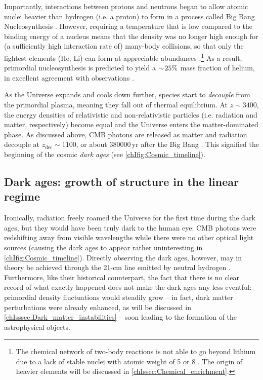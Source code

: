 Importantly, interactions between protons and neutrons began to allow atomic nuclei heavier than hydrogen (i.e. a proton) to form in a process called Big Bang Nucleosynthesis \citep[BBN; work on this was pioneered by][]{1949RvMP...21..367G}. However, requiring a temperature that is low compared to the binding energy of a nucleus means that the density was no longer high enough for (a sufficiently high interaction rate of) many-body collisions, so that only the lightest elements (He, Li) can form at appreciable abundances \citep{1967ApJ...148....3W}.\footnote{The chemical network of two-body reactions is not able to go beyond lithium due to a lack of stable nuclei with atomic weight of 5 or 8 \citep[e.g.][]{2010gfe..book.....M}. The origin of heavier elements will be discussed in \cref{chIssec:Chemical_enrichment}.} As a result, primordial nucleosynthesis is predicted to yield a $\sim \! 25\%$ mass fraction of helium, in excellent agreement with observations \citep[and hence considered a key validation of the Big Bang theory;][]{2016RvMP...88a5004C}.

As the Universe expands and cools down further, species start to \textit{decouple} from the primordial plasma, meaning they fall out of thermal equilibrium. At $z \sim 3400$, the energy densities of relativistic and non-relativistic particles (i.e. radiation and matter, respectively) become equal and the Universe enters the matter-dominated phase. As discussed above, CMB photons are released as matter and radiation decouple at $z_\text{dec} \sim 1100$, or about $\num{380000} \, \mathrm{yr}$ after the Big Bang \citep{2010gfe..book.....M}. This signified the beginning of the cosmic \textit{dark ages} (see \cref{chIfig:Cosmic_timeline}).

\subsection{Dark ages: growth of structure in the linear regime}
\label{chIssec:Growth_of_structure_in_the_linear_regime}

Ironically, radiation freely roamed the Universe for the first time during the dark ages, but they would have been truly dark to the human eye: CMB photons were redshifting away from visible wavelengths while there were no other optical light sources (causing the dark ages to appear rather uninteresting in \cref{chIfig:Cosmic_timeline}). Directly observing the dark ages, however, may in theory be achieved through the 21-cm line emitted by neutral hydrogen \citep[e.g.][]{2006PhR...433..181F}. Furthermore, like their historical counterpart, the fact that there is no clear record of what exactly happened does not make the dark ages any less eventful: primordial density fluctuations would steadily grow -- in fact, dark matter perturbations were already enhanced, as will be discussed in \cref{chIsssec:Dark_matter_instabilities} -- soon leading to the formation of the astrophysical objects.

